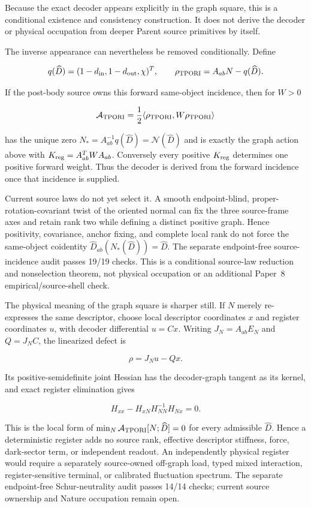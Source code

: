 \documentclass[11pt]{article}
\begin{document}
Because the exact decoder appears explicitly in the graph square, this is a
conditional existence and consistency construction.  It does not derive the
decoder or physical occupation from deeper Parent source primitives by
itself.

The inverse appearance can nevertheless be removed conditionally.  Define

\[
q(\widehat D)=(1-d_{\rm in},1-d_{\rm out},\chi)^T,
\qquad
\rho_{\rm TPORI}=A_{ab}N-q(\widehat D).
\]

If the post-body source owns this forward same-object incidence, then for
$W>0$

\[
\mathcal A_{\rm TPORI}
=\frac12\langle\rho_{\rm TPORI},W\rho_{\rm TPORI}\rangle
\]

has the unique zero
$N_*=A_{ab}^{-1}q(\widehat D)=\mathcal N(\widehat D)$ and is exactly the graph
action above with $K_{\rm reg}=A_{ab}^{T}WA_{ab}$.  Conversely every positive
$K_{\rm reg}$ determines one positive forward weight.  Thus the decoder is
derived from the forward incidence once that incidence is supplied.

Current source laws do not yet select it.  A smooth endpoint-blind,
proper-rotation-covariant twist of the oriented normal can fix the three
source-frame axes and retain rank two while defining a distinct positive
graph.  Hence positivity, covariance, anchor fixing, and complete local rank
do not force the same-object coidentity
$\widehat D_{ab}(N_*(\widehat D))=\widehat D$.  The separate endpoint-free
source-incidence audit passes 19/19 checks.  This is a conditional source-law
reduction and nonselection theorem, not physical occupation or an additional
Paper~8 empirical/source-shell check.

The physical meaning of the graph square is sharper still.  If $N$ merely
re-expresses the same descriptor, choose local descriptor coordinates $x$ and
register coordinates $u$, with decoder differential $u=Cx$.  Writing
$J_N=A_{ab}E_N$ and $Q=J_NC$, the linearized defect is

\[
\rho=J_Nu-Qx.
\]

Its positive-semidefinite joint Hessian has the decoder-graph tangent as its kernel, and
exact register elimination gives

\[
\boxed{H_{xx}-H_{xN}H_{NN}^{-1}H_{Nx}=0.}
\]

This is the local form of
$\min_N\mathcal A_{\rm TPORI}[N;\widehat D]=0$ for every admissible
$\widehat D$.  Hence a deterministic register adds no source rank, effective
descriptor stiffness, force, dark-sector term, or independent readout.  An
independently physical register would require a separately source-owned
off-graph load, typed mixed interaction, register-sensitive terminal, or
calibrated fluctuation spectrum.  The separate endpoint-free
Schur-neutrality audit passes 14/14 checks; current source ownership and
Nature occupation remain open.
\end{document}
